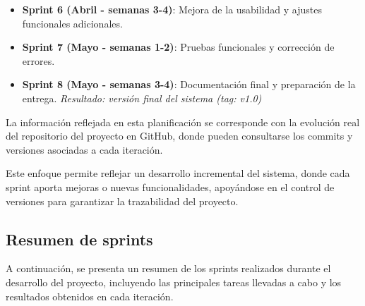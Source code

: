\begin{itemize}
    \textit{Resultado: versión avanzada y estable del sistema (tag: v0.4)}

    \item \textbf{Sprint 6 (Abril - semanas 3-4)}: Mejora de la usabilidad y ajustes funcionales adicionales.  
    

    \item \textbf{Sprint 7 (Mayo - semanas 1-2)}: Pruebas funcionales y corrección de errores.  
     

    \item \textbf{Sprint 8 (Mayo - semanas 3-4)}: Documentación final y preparación de la entrega.  
    \textit{Resultado: versión final del sistema (tag: v1.0)}
\end{itemize}

La información reflejada en esta planificación se corresponde con la evolución real del repositorio del proyecto en GitHub, donde pueden consultarse los commits y versiones asociadas a cada iteración.

Este enfoque permite reflejar un desarrollo incremental del sistema, donde cada sprint aporta mejoras o nuevas funcionalidades, apoyándose en el control de versiones para garantizar la trazabilidad del proyecto.

\subsection{Resumen de sprints}

A continuación, se presenta un resumen de los sprints realizados durante el desarrollo del proyecto, incluyendo las principales tareas llevadas a cabo y los resultados obtenidos en cada iteración.


